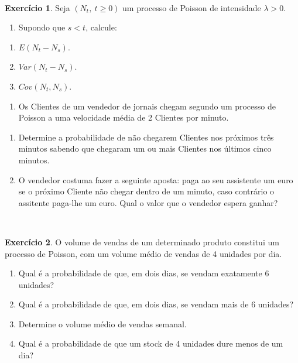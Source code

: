 \documentclass[
  11pt,
  a4paper,
]{book}
\providecommand{\tightlist}{%
  \setlength{\itemsep}{0pt}\setlength{\parskip}{0pt}}
\theoremstyle{definition}
\theoremstyle{definition}
\theoremstyle{definition}
\newtheorem{exercise}{Exercício}[chapter]
\theoremstyle{definition}
\theoremstyle{remark}
\begin{document}
\(\,\)

\begin{exercise}
\leavevmode

Seja \((N_t, ~ t \geq 0)\) um processo de Poisson de intensidade \(\lambda >0\).

\begin{enumerate}
\def\labelenumi{(\alph{enumi})}
\tightlist
\item
  Supondo que \(s<t\), calcule:
\end{enumerate}

\begin{enumerate}
\def\labelenumi{\roman{enumi}.}
\item
  \(E(N_t-N_s)\).
\item
  \(Var(N_t-N_s)\).
\item
  \(Cov(N_t,N_s)\).
\end{enumerate}

\begin{enumerate}
\def\labelenumi{(\alph{enumi})}
\setcounter{enumi}{1}
\tightlist
\item
  Os Clientes de um vendedor de jornais chegam segundo um processo de Poisson a uma velocidade média de 2 Clientes por minuto.
\end{enumerate}

\begin{enumerate}
\def\labelenumi{\roman{enumi}.}
\item
  Determine a probabilidade de não chegarem Clientes nos próximos três minutos sabendo que chegaram um ou mais Clientes nos últimos cinco minutos.
\item
  O vendedor costuma fazer a seguinte aposta: paga ao seu assistente um euro se o próximo Cliente não chegar dentro de um minuto, caso contrário o assitente paga-lhe um euro. Qual o valor que o vendedor espera ganhar?
\end{enumerate}

\end{exercise}

\(\,\)

\begin{exercise}
\leavevmode

O volume de vendas de um determinado produto constitui um processo de Poisson, com um volume médio de vendas de 4 unidades por dia.

\begin{enumerate}
\def\labelenumi{(\alph{enumi})}
\item
  Qual é a probabilidade de que, em dois dias, se vendam exatamente 6 unidades?
\item
  Qual é a probabilidade de que, em dois dias, se vendam mais de 6 unidades?
\item
  Determine o volume médio de vendas semanal.
\item
  Qual é a probabilidade de que um stock de 4 unidades dure menos de um dia?
\end{enumerate}

\end{exercise}
\end{document}
